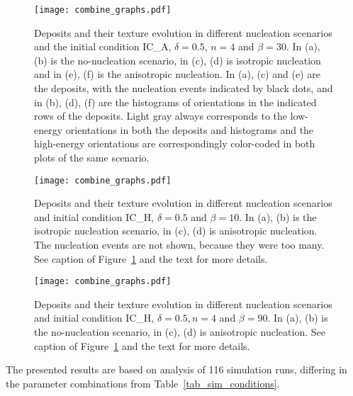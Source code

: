 \begin{figure}
	\centering
	\texttt{[image: combine\_graphs.pdf]}
	\caption[MC simulation results - deposits and their texture evolution in different nucleation scenarios in the case IC\_A, $\delta=0.5$, $n=4$ and $\beta=30$ (rather fast deposition)]{Deposits and their texture evolution in different nucleation scenarios and the initial condition IC\_A, $\delta=0.5$, $n=4$ and $\beta=30$. In (a), (b) is the no-nucleation scenario, in (c), (d) is isotropic nucleation and in (e), (f) is the anisotropic nucleation. In (a), (c) and (e) are the deposits, with the nucleation events indicated by black dots, and in (b), (d), (f) are the histograms of orientations in the indicated rows of the deposits. Light gray always corresponds to the low-energy orientations in both the deposits and histograms and the high-energy orientations are correspondingly color-coded in both plots of the same scenario.}
	\label{fig_MC_deposits_ori_ev_1}
\end{figure}
\begin{figure}
	\centering
	\texttt{[image: combine\_graphs.pdf]}
	\caption[MC simulation results - deposits and their texture evolution in different nucleation scenarios in the case IC\_H, $\delta=0.5$ and $\beta=10$ (fast deposition)]{Deposits and their texture evolution in different nucleation scenarios and initial condition IC\_H, $\delta=0.5$ and $\beta=10$. In (a), (b) is the isotropic nucleation scenario, in (c), (d) is anisotropic nucleation. The nucleation events are not shown, because they were too many. See caption of Figure~\ref{fig_MC_deposits_ori_ev_1} and the text for more details.}
	\label{fig_MC_deposits_ori_ev_2}
\end{figure}
\begin{figure}
	\centering
	\texttt{[image: combine\_graphs.pdf]}
	\caption[MC simulation results - deposits and their texture evolution in different nucleation scenarios in the case IC\_H, $\delta=0.5, n=4$ and $\beta=90$ (very slow deposition)]{Deposits and their texture evolution in different nucleation scenarios and initial condition IC\_H, $\delta=0.5, n=4$ and $\beta=90$. In (a), (b) is the no-nucleation scenario, in (c), (d) is anisotropic nucleation. See caption of Figure~\ref{fig_MC_deposits_ori_ev_1} and the text for more details.}
	\label{fig_MC_deposits_ori_ev_3}
\end{figure}
The presented results are based on analysis of 116 simulation runs, differing in the parameter combinations from Table~\ref{tab_sim_conditions}.

